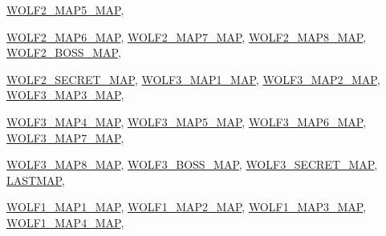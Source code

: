 \begin{DoxyCompactItemize}
\hyperlink{MAPSWL1_8H_a1949852ef0462081a2b248dd4918bb86ac7d89e85f4f4cd83a469db82b19bcd31}{WOLF2\_\-MAP5\_\-MAP}, 
\par
\hyperlink{MAPSWL1_8H_a1949852ef0462081a2b248dd4918bb86a4473d9cc197c7acc2b3516d4fa17da76}{WOLF2\_\-MAP6\_\-MAP}, 
\hyperlink{MAPSWL1_8H_a1949852ef0462081a2b248dd4918bb86a109a84d23d4e2d9476dd201d1bf565a5}{WOLF2\_\-MAP7\_\-MAP}, 
\hyperlink{MAPSWL1_8H_a1949852ef0462081a2b248dd4918bb86ac7e9ff2da7d29771bbae6b4fa3f9a486}{WOLF2\_\-MAP8\_\-MAP}, 
\hyperlink{MAPSWL1_8H_a1949852ef0462081a2b248dd4918bb86a88f09783575198a9583fbdb3e7c8fe2f}{WOLF2\_\-BOSS\_\-MAP}, 
\par
\hyperlink{MAPSWL1_8H_a1949852ef0462081a2b248dd4918bb86a9ed42ca05cbe822f8b40168c19a4ed77}{WOLF2\_\-SECRET\_\-MAP}, 
\hyperlink{MAPSWL1_8H_a1949852ef0462081a2b248dd4918bb86a0d6791b2c6c686178e630dc8780f3862}{WOLF3\_\-MAP1\_\-MAP}, 
\hyperlink{MAPSWL1_8H_a1949852ef0462081a2b248dd4918bb86ae28f49c42ce451b9907c945b53a8f150}{WOLF3\_\-MAP2\_\-MAP}, 
\hyperlink{MAPSWL1_8H_a1949852ef0462081a2b248dd4918bb86a0bd10b8507e1d5208f7fc7190dd1da82}{WOLF3\_\-MAP3\_\-MAP}, 
\par
\hyperlink{MAPSWL1_8H_a1949852ef0462081a2b248dd4918bb86a90ebcb09ab1567937fd158f38ebd1c60}{WOLF3\_\-MAP4\_\-MAP}, 
\hyperlink{MAPSWL1_8H_a1949852ef0462081a2b248dd4918bb86a80a97ef076ec587cbfe05e7673778499}{WOLF3\_\-MAP5\_\-MAP}, 
\hyperlink{MAPSWL1_8H_a1949852ef0462081a2b248dd4918bb86a7103424829314ef6780f7b984b591d1a}{WOLF3\_\-MAP6\_\-MAP}, 
\hyperlink{MAPSWL1_8H_a1949852ef0462081a2b248dd4918bb86a9809951987be0669e3a1b05b26f031e4}{WOLF3\_\-MAP7\_\-MAP}, 
\par
\hyperlink{MAPSWL1_8H_a1949852ef0462081a2b248dd4918bb86ae1a84a558d40b14ba6ab19e16dbc8ef8}{WOLF3\_\-MAP8\_\-MAP}, 
\hyperlink{MAPSWL1_8H_a1949852ef0462081a2b248dd4918bb86aeabb6ea46b7a910028143794d53b4240}{WOLF3\_\-BOSS\_\-MAP}, 
\hyperlink{MAPSWL1_8H_a1949852ef0462081a2b248dd4918bb86aaa7c864b61599c6909e31b90510a6680}{WOLF3\_\-SECRET\_\-MAP}, 
\hyperlink{MAPSWL1_8H_a1949852ef0462081a2b248dd4918bb86ad3af5aeeef56724be68af11d0a6680b3}{LASTMAP}, 
\par
\hyperlink{MAPSWL6_8H_a1949852ef0462081a2b248dd4918bb86a832a4584aa8b3c94cd186165008af81e}{WOLF1\_\-MAP1\_\-MAP}, 
\hyperlink{MAPSWL6_8H_a1949852ef0462081a2b248dd4918bb86ab3385d1f9ceae4fe5f683d14ad7dbeb1}{WOLF1\_\-MAP2\_\-MAP}, 
\hyperlink{MAPSWL6_8H_a1949852ef0462081a2b248dd4918bb86a058d20217d52b2ce66f382a84f532846}{WOLF1\_\-MAP3\_\-MAP}, 
\hyperlink{MAPSWL6_8H_a1949852ef0462081a2b248dd4918bb86a4892b0039fbd140332561dd89194976f}{WOLF1\_\-MAP4\_\-MAP}, 

\end{DoxyCompactItemize}
